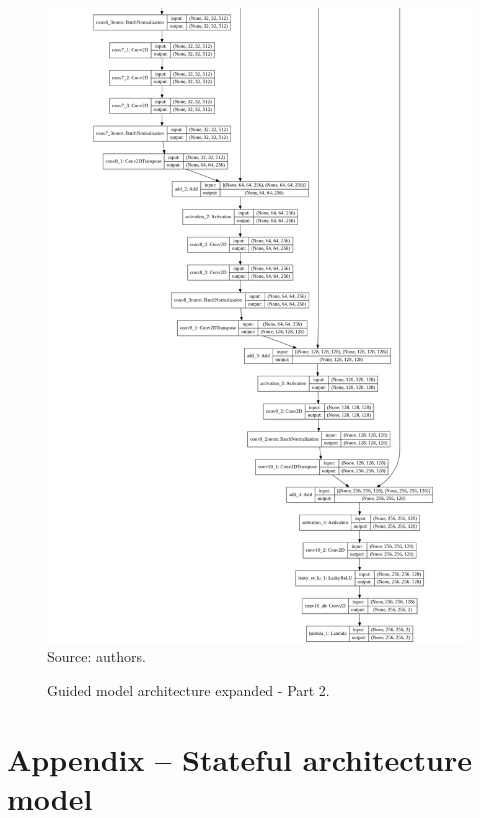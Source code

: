 \documentclass[12pt,openright,oneside,a4paper,english, brazilian]{abntex2}
\begin{document}
\begin{otherlanguage}{english}
\begin{figure}[!htb]
\centering
\caption{Guided model architecture expanded - Part 2.}
\includegraphics[height = \textheight - 1.5cm]{model_plot/Guided2}
Source: authors.
\label{guided_plot_2}
\end{figure}

\chapter{Appendix -- Stateful architecture model}


\end{otherlanguage}
\end{document}
